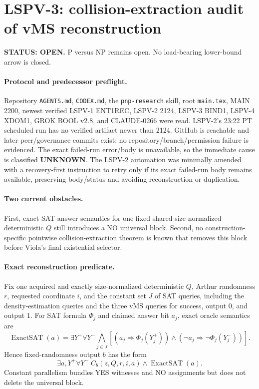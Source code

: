 \documentclass[11pt]{article}
\begin{document}
\section*{LSPV-3: collision-extraction audit of vMS reconstruction}
\textbf{STATUS: OPEN.} P versus NP remains open. No load-bearing lower-bound arrow is closed.

\paragraph{Protocol and predecessor preflight.}
Repository \texttt{AGENTS.md}, \texttt{CODEX.md}, the \texttt{pnp-research} skill, root \texttt{main.tex}, MAIN 2200, newest verified LSPV-1 ENT1REC, LSPV-2 2124, LSPV-3 BIND1, LSPV-4 XDOM1, GROK BOOL v2.8, and CLAUDE-0266 were read. LSPV-2's 23:22 PT scheduled run has no verified artifact newer than 2124. GitHub is reachable and later peer/governance commits exist; no repository/branch/permission failure is evidenced. The exact failed-run error/body is unavailable, so the immediate cause is classified \textbf{UNKNOWN}. The LSPV-2 automation was minimally amended with a recovery-first instruction to retry only if its exact failed-run body remains available, preserving body/status and avoiding reconstruction or duplication.

\paragraph{Two current obstacles.}
First, exact SAT-answer semantics for one fixed shared size-normalized deterministic $Q$ still introduces a NO universal block. Second, no construction-specific pointwise collision-extraction theorem is known that removes this block before Viola's final existential selector.

\paragraph{Exact reconstruction predicate.}
Fix one acquired and exactly size-normalized deterministic $Q$, Arthur randomness $r$, requested coordinate $i$, and the constant set $J$ of SAT queries, including the density-estimation queries and the three vMS queries for success, output $0$, and output $1$. For SAT formula $\Phi_j$ and claimed answer bit $a_j$, exact oracle semantics are
\[
\operatorname{ExactSAT}(a)=
\exists Y^+\forall Y^-\!
\bigwedge_{j\in J}\left[(a_j\Rightarrow\Phi_j(Y_j^+))\wedge(\neg a_j\Rightarrow\neg\Phi_j(Y_j^-))\right].
\]
Hence fixed-randomness output $b$ has the form
\[
\exists a,Y^+\forall Y^-\;C_b(z,Q,r,i,a)\wedge\operatorname{ExactSAT}(a).
\]
Constant parallelism bundles YES witnesses and NO assignments but does not delete the universal block.
\end{document}
